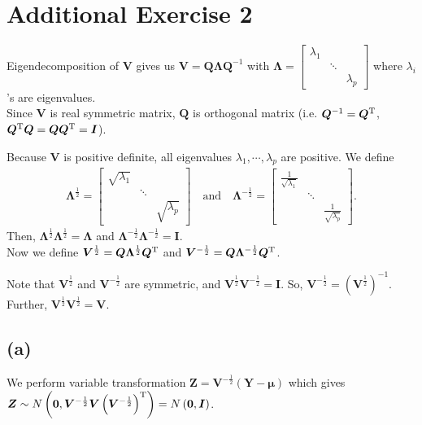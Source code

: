 \section*{Additional Exercise 2}
Eigendecomposition of $\bm{V}$ gives us $\bm{V} = \bm{Q}\bm{\Lambda}\bm{Q}^{-1}$ with $\bm{\Lambda} = 
\begin{bmatrix}
\lambda_{1} & &\\
 & \ddots & \\
 &  & \lambda_{p}
\end{bmatrix}$ where $\lambda_{i}$'s are eigenvalues.\\
Since $\bm{V}$ is real symmetric matrix, $\bm{Q}$ is orthogonal matrix (i.e. $\bm{Q}^{-1} = \bm{Q}^{\rm T}$, $\bm{Q}^{\rm T}\bm{Q} = \bm{Q}\bm{Q}^{\rm T} = \bm{I}$).

Because $\bm{V}$ is positive definite, all eigenvalues $\lambda_{1}, \cdots, \lambda_{p}$ are positive. We define
\begin{align*}
\bm{\Lambda}^{\frac{1}{2}} = 
\begin{bmatrix}
\sqrt{\lambda_{1}} & &\\
 & \ddots & \\
 &  & \sqrt{\lambda_{p}}
\end{bmatrix}
\quad \mbox{and} \quad
\bm{\Lambda}^{-\frac{1}{2}} = 
\begin{bmatrix}
\frac{1}{\sqrt{\lambda_{1}}} & &\\
 & \ddots & \\
 &  & \frac{1}{\sqrt{\lambda_{p}}}
\end{bmatrix}.
\end{align*}
Then, $\bm{\Lambda}^{\frac{1}{2}}\bm{\Lambda}^{\frac{1}{2}}  = \bm{\Lambda}$ and $\bm{\Lambda}^{-\frac{1}{2}}\bm{\Lambda}^{-\frac{1}{2}}  = \bm{I}$.\\
Now we define
$\bm{V}^{\frac{1}{2}} = \bm{Q}\bm{\Lambda}^{\frac{1}{2}}\bm{Q}^{\rm T}$ and $\bm{V}^{-\frac{1}{2}} = \bm{Q}\bm{\Lambda}^{-\frac{1}{2}}\bm{Q}^{\rm T}$.


Note that $\bm{V}^{\frac{1}{2}}$ and $\bm{V}^{-\frac{1}{2}}$ are symmetric, and $\bm{V}^{\frac{1}{2}}\bm{V}^{-\frac{1}{2}} = \bm{I}$. So, $\bm{V}^{-\frac{1}{2}} = \left(\bm{V}^{\frac{1}{2}}\right)^{-1}$. Further, $\bm{V}^{\frac{1}{2}}\bm{V}^{\frac{1}{2}} = \bm{V}$.

\subsection*{(a)}
We perform variable transformation $\bm{Z} = \bm{V}^{-\frac{1}{2}}(\bm{Y} - \bm{\mu})$ which gives $\bm{Z} \sim N\left(\bm{0}, \bm{V}^{-\frac{1}{2}}\bm{V}\left(\bm{V}^{-\frac{1}{2}}\right)^{\rm T} \right) = N\left(\bm{0}, \bm{I}\right)$.\\


